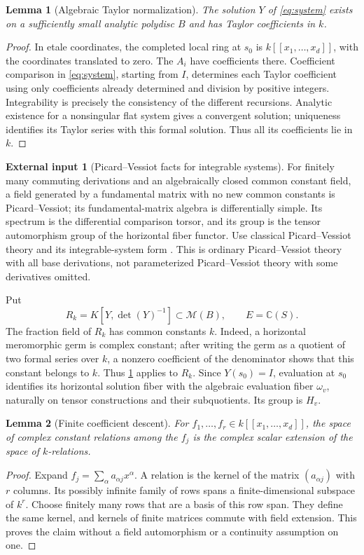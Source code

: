 \documentclass[11pt]{article}
\numberwithin{equation}{section}
\newtheorem{lemma}[lemma]{Lemma}
\theoremstyle{definition}
\newtheorem{externalinput}[externalinput]{External input}
\theoremstyle{remark}
\newcommand{\C}{\mathbb C}
\begin{document}
\begin{lemma}[Algebraic Taylor normalization]\label{lem:taylor}
The solution $Y$ of \eqref{eq:system} exists on a sufficiently small
analytic polydisc $B$ and has Taylor coefficients in $k$.
\end{lemma}
\begin{proof}
In etale coordinates, the completed local ring at $s_0$ is
$k[[x_1,\ldots,x_d]]$, with the coordinates translated to zero.
The $A_i$ have coefficients there. Coefficient comparison in
\eqref{eq:system}, starting from $I$, determines each Taylor coefficient
using only coefficients already determined and division by positive
integers. Integrability is precisely the consistency of the different
recursions. Analytic existence for a nonsingular flat system gives a
convergent solution; uniqueness identifies its Taylor series with this
formal solution. Thus all its coefficients lie in $k$.
\end{proof}

\begin{externalinput}[Picard--Vessiot facts for integrable systems]\label{input:pv}
For finitely many commuting derivations and an algebraically closed common
constant field, a field generated by a fundamental matrix with no new
common constants is Picard--Vessiot; its fundamental-matrix algebra is
differentially simple. Its spectrum is the differential comparison torsor,
and its group is the tensor automorphism group of the horizontal fiber
functor. Use classical Picard--Vessiot theory and its integrable-system
form \cite{PutSinger,Kolchin,CHM}. This is ordinary Picard--Vessiot theory
with all base derivations, not parameterized Picard--Vessiot theory with
some derivatives omitted.
\end{externalinput}

Put
\[
 R_k=K[Y,\det(Y)^{-1}]\subset\mathscr M(B),\qquad E=\C(S).
\]
The fraction field of $R_k$ has common constants $k$. Indeed, a horizontal
meromorphic germ is complex constant; after writing the germ as a quotient
of two formal series over $k$, a nonzero coefficient of the denominator
shows that this constant belongs to $k$. Thus \cref{input:pv} applies to
$R_k$. Since $Y(s_0)=I$, evaluation at $s_0$ identifies its horizontal
solution fiber with the algebraic evaluation fiber $\omega_v$, naturally
on tensor constructions and their subquotients. Its group is $H_v$.

\begin{lemma}[Finite coefficient descent]\label{lem:finite-linear}
For $f_1,\ldots,f_r\in k[[x_1,\ldots,x_d]]$, the space of complex
constant relations among the $f_j$ is the complex scalar extension of
the space of $k$-relations.
\end{lemma}
\begin{proof}
Expand $f_j=\sum_\alpha a_{\alpha j}x^\alpha$. A relation is the
kernel of the matrix $(a_{\alpha j})$ with $r$ columns. Its possibly
infinite family of rows spans a finite-dimensional subspace of $k^r$.
Choose finitely many rows that are a basis of this row span. They define
the same kernel, and kernels of finite matrices commute with field
extension. This proves the claim without a field automorphism or a
continuity assumption on one.
\end{proof}
\end{document}
